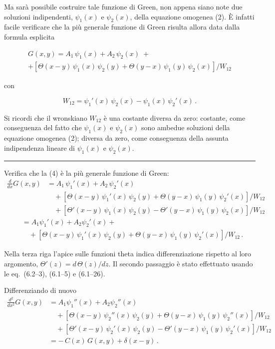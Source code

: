 \documentclass[11pt, a4paper]{book}
\numberwithin{equation}{section}
\begin{document}
Ma sarà possibile costruire tale funzione di Green, non appena siano note due soluzioni indipendenti, $\psi_1(x)$ e $\psi_2(x)$, della equazione omogenea (2). È infatti facile verificare che la più generale funzione di Green risulta allora data dalla formula esplicita

\begin{equation}
\begin{aligned}
    G(x,y) = A_1 \, \psi_1(x) + A_2 \, \psi_2(x) \; + \\
    + \left[ \Theta(x-y)\,\psi_1(x)\,\psi_2(y) + \Theta(y-x)\,\psi_1(y)\,\psi_2(x) \right] / W_{12}
\end{aligned}
\end{equation}

con

\begin{equation}
    W_{12} = \psi_1'(x)\,\psi_2(x) - \psi_1(x)\,\psi_2'(x) \,.
\end{equation}

Si ricordi che il wronskiano $W_{12}$ è una costante diversa da zero: costante, come conseguenza del fatto che $\psi_1(x)$ e $\psi_2(x)$ sono ambedue soluzioni della equazione omogenea (2); diversa da zero, come conseguenza della assunta indipendenza lineare di $\psi_1(x)$ e $\psi_2(x)$.

\medskip
\noindent\rule{\textwidth}{0.4pt}
Verifica che la (4) è la più generale funzione di Green:
\begin{align*}
\frac{d}{dx} G(x,y) &= A_1\,\psi_1'(x) + A_2\,\psi_2'(x) \\
&\quad + \left[ \Theta(x-y)\,\psi_1'(x)\,\psi_2(y) + \Theta(y-x)\,\psi_1(y)\,\psi_2'(x) \right] / W_{12} \\
&\quad + \left[ \Theta'(x-y)\,\psi_1(x)\,\psi_2(y) - \Theta'(y-x)\,\psi_1(y)\,\psi_2(x) \right] / W_{12}
\end{align*} 
\begin{align*}
&= A_1 \psi_1'(x) + A_2 \psi_2'(x) + \\
&\quad + \left[\Theta(x-y)\,\psi_1'(x)\,\psi_2(y) + \Theta(y-x)\,\psi_1(y)\,\psi_2'(x)\right] / W_{12} \,.
\end{align*}

Nella terza riga l'apice sulle funzioni theta indica differenziazione rispetto al loro argomento, $\Theta'(z) = d\,\Theta(z)/dz$. Il secondo passaggio è stato effettuato usando le eq.\ (6.2--3), (6.1--5) e (6.1--26).

Differenziando di nuovo
\begin{align*}
\frac{d^2}{dx^2} G(x,y) &= A_1 \psi_1''(x) + A_2 \psi_2''(x) \\
&\quad + \left[\Theta(x-y)\,\psi_2''(x)\,\psi_2(y) + \Theta(y-x)\,\psi_1(y)\,\psi_2''(x)\right]/W_{12} \\
&\quad + \left[\Theta'(x-y)\,\psi_2'(x)\,\psi_2(y) - \Theta'(y-x)\,\psi_1(y)\,\psi_2'(x)\right]/W_{12} \\
&= -\,C(x)\,G(x,y) + \delta(x-y)\,.
\end{align*}
\end{document}

